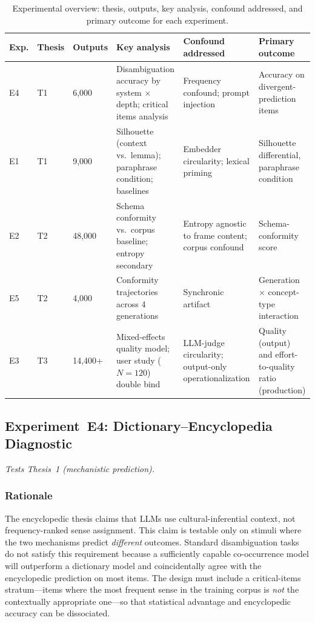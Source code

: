 \documentclass[12pt,a4paper]{article}
\begin{document}
\begin{table}[ht]
\centering
\small
\renewcommand{\arraystretch}{1.4}
\begin{tabularx}{\textwidth}{p{0.7cm}p{1.5cm}p{1.7cm}p{2.8cm}p{2.8cm}p{2.5cm}}
\toprule
\textbf{Exp.} & \textbf{Thesis} & \textbf{Outputs} & \textbf{Key analysis} &
\textbf{Confound addressed} & \textbf{Primary outcome} \\
\midrule
E4 & T1 & 6,000 &
Disambiguation accuracy by system $\times$ depth; critical items analysis &
Frequency confound; prompt injection &
Accuracy on divergent-prediction items \\
\addlinespace
E1 & T1 & 9,000 &
Silhouette (context vs.\ lemma); paraphrase condition; baselines &
Embedder circularity; lexical priming &
Silhouette differential, paraphrase condition \\
\addlinespace
E2 & T2 & 48,000 &
Schema conformity vs.\ corpus baseline; entropy secondary &
Entropy agnostic to frame content; corpus confound &
Schema-conformity score \\
\addlinespace
E5 & T2 & 4,000 &
Conformity trajectories across 4 generations &
Synchronic artifact &
Generation $\times$ concept-type interaction \\
\addlinespace
E3 & T3 & 14,400+ &
Mixed-effects quality model; user study ($N=120$) double bind &
LLM-judge circularity; output-only operationalization &
Quality (output) and effort-to-quality ratio (production) \\
\bottomrule
\end{tabularx}
\caption{Experimental overview: thesis, outputs, key analysis, confound
addressed, and primary outcome for each experiment.}
\label{tab:exp_summary}
\end{table}

\subsection{Experiment~E4: Dictionary--Encyclopedia Diagnostic}
\label{sec:exp4}

\emph{Tests Thesis~1 (mechanistic prediction).}

\subsubsection{Rationale}

The encyclopedic thesis claims that LLMs use cultural-inferential context,
not frequency-ranked sense assignment. This claim is testable only on stimuli
where the two mechanisms predict \emph{different} outcomes. Standard
disambiguation tasks do not satisfy this requirement because a sufficiently
capable co-occurrence model will outperform a dictionary model and coincidentally
agree with the encyclopedic prediction on most items. The design must include a
critical-items stratum---items where the most frequent sense in the training
corpus is \emph{not} the contextually appropriate one---so that statistical
advantage and encyclopedic accuracy can be dissociated.
\end{document}
